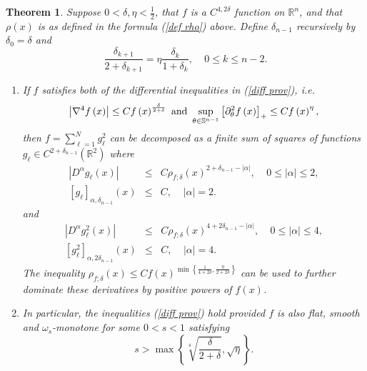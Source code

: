 \documentclass{amsart}
\newtheorem{theorem}{Theorem}[section]
\theoremstyle{plain}
\numberwithin{equation}{section}
\begin{document}
\begin{theorem}
\label{efs eps}Suppose $0<\delta ,\eta <\frac{1}{2}$, that $f$ is a $%
C^{4,2\delta }$ function on $\mathbb{R}^{n}$, and that $\rho \left( x\right) 
$ is as defined in the formula (\ref{def rho}) above. Define $\delta _{n-1}$
recursively by $\delta _{0}=\delta $ and%
\begin{equation}
\frac{\delta _{k+1}}{2+\delta _{k+1}}=\eta \frac{\delta _{k}}{1+\delta _{k}}%
,\ \ \ \ \ 0\leq k\leq n-2.  \label{recurse}
\end{equation}

\begin{enumerate}
\item If $f$ satisfies both of the differential inequalities in (\ref{diff
prov}), i.e.%
\begin{equation*}
\left\vert \nabla ^{4}f\left( x\right) \right\vert \leq Cf\left( x\right) ^{%
\frac{\delta }{2+\delta }}\text{ and }\sup_{\theta \in \mathbb{S}^{n-1}}%
\left[ \partial _{\theta }^{2}f\left( x\right) \right] _{+}\leq Cf\left(
x\right) ^{\eta },
\end{equation*}%
then $f=\sum_{\ell =1}^{N}g_{\ell }^{2}$ can be decomposed as a finite sum
of squares of functions $g_{\ell }\in C^{2+\delta _{n-1}}\left( \mathbb{R}%
^{2}\right) $ where 
\begin{eqnarray*}
\left\vert D^{\alpha }g_{\ell }\left( x\right) \right\vert &\leq &C\rho
_{f;\delta }\left( x\right) ^{2+\delta _{n-1}-\left\vert \alpha \right\vert
},\ \ \ \ \ 0\leq \left\vert \alpha \right\vert \leq 2, \\
\left[ g_{\ell }\right] _{\alpha ,\delta _{n-1}}\left( x\right) &\leq &C,\ \
\ \ \ \left\vert \alpha \right\vert =2.
\end{eqnarray*}%
and%
\begin{eqnarray*}
\left\vert D^{\alpha }g_{\ell }^{2}\left( x\right) \right\vert &\leq &C\rho
_{f;\delta }\left( x\right) ^{4+2\delta _{n-1}-\left\vert \alpha \right\vert
},\ \ \ \ \ 0\leq \left\vert \alpha \right\vert \leq 4, \\
\left[ g_{\ell }^{2}\right] _{\alpha ,2\delta _{n-1}}\left( x\right) &\leq
&C,\ \ \ \ \ \left\vert \alpha \right\vert =4.
\end{eqnarray*}%
The inequality $\rho _{f;\delta }\left( x\right) \leq Cf\left( x\right)
^{\min \left\{ \frac{1}{4+2\delta },\frac{\eta }{2+2\delta }\right\} }$ can
be used to further dominate these derivatives by positive powers of $f\left(
x\right) $.

\item In particular, the inequalities (\ref{diff prov}) hold provided $f$ is
also flat, smooth and $\omega _{s}$-monotone for some $0<s<1$ satisfying%
\begin{equation}
s>\max \left\{ \sqrt[4]{\frac{\delta }{2+\delta }},\sqrt{\eta }\right\} .
\label{eps delta}
\end{equation}
\end{enumerate}
\end{theorem}
\end{document}
